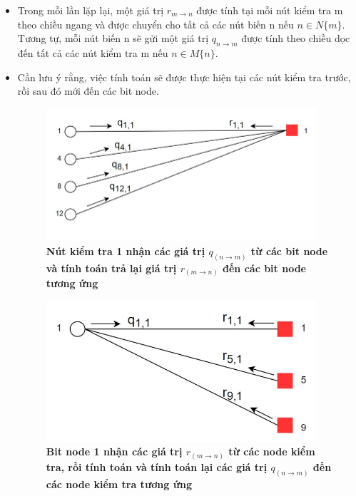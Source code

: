 \documentclass{article}
\begin{document}
\begin{itemize}
    \item 	Trong mỗi lần lặp lại, một giá trị $r_{m \to n}$ được tính tại mỗi nút kiểm tra m theo chiều ngang và được chuyển cho tất cả các nút biến n nếu $n\in N\{m\}$. Tương tự, mỗi nút biến n sẽ gửi một giá trị $q_{n \to m}$ được tính theo chiều dọc đến tất cả các nút kiểm tra m nếu $n \in M\{n\}$.
    \item   Cần lưu ý rằng, việc tính toán sẽ được thực hiện tại các nút kiểm tra trước, rồi sau đó mới đến các bit node.
    \begin{figure}[H]
    \centering
    \includegraphics[width=10cm]{images/ktra3.JPG}
    \caption[Nút kiểm tra  1 nhận các giá trị $q_(n \to m)$ từ các bit node và tính toán trả lại giá trị $r_{(m \to n)}$ đến các bit node tương ứng ]{\bfseries\fontsize{12pt}{0pt} \selectfont Nút kiểm tra  1 nhận các giá trị $q_{(n \to m)}$ từ các bit node và tính toán trả lại giá trị $r_{(m \to n)}$ đến các bit node tương ứng} %
    \label{hinh14}
\end{figure}
    \begin{figure}[H]
    \centering
    \includegraphics[width=10cm]{images/ktra4.JPG}
    \caption[Bit node 1 nhận các giá trị $r_{(m \to n)}$ từ các node kiểm tra, rồi tính toán và tính toán lại các giá trị $q_{(n \to m)}$ đến các node kiểm tra tương ứng ]{\bfseries\fontsize{12pt}{0pt} \selectfont Bit node 1 nhận các giá trị $r_{(m \to n)}$ từ các node kiểm tra, rồi tính toán và tính toán lại các giá trị $q_{(n \to m)}$ đến các node kiểm tra tương ứng} %

\end{figure}
\end{itemize}
\end{document}

